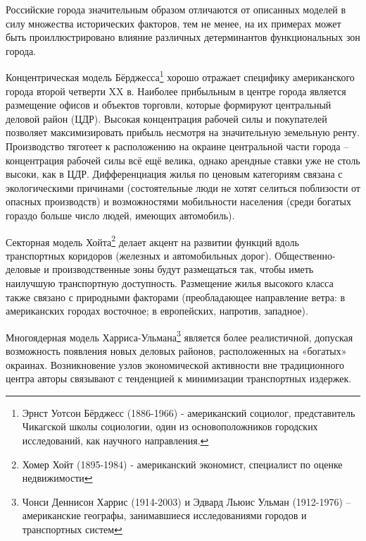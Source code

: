 \documentclass[
  11pt,
  russian,
]{book}
\begin{document}
Российские города значительным образом отличаются от описанных моделей в силу множества исторических факторов, тем не
менее, на их примерах может быть проиллюстрировано влияние различных детерминантов функциональных зон города.

Концентрическая модель Бёрджесса\footnote{Эрнст Уотсон Бёрджесс (1886-1966) - американский социолог, представитель Чикагской школы социологии, один из
  основоположников городских исследований, как научного направления.}
хорошо отражает специфику американского города второй четверти XX в. Наиболее прибыльным в центре города
является размещение офисов и объектов торговли, которые формируют центральный деловой район (ЦДР). Высокая концентрация рабочей силы и покупателей позволяет максимизировать прибыль несмотря на значительную земельную ренту. Производство
тяготеет к расположению на окраине центральной части города -- концентрация рабочей силы всё ещё велика, однако арендные ставки уже не столь высоки, как в ЦДР. Дифференциация жилья по ценовым категориям связана с экологическими причинами (состоятельные люди не хотят селиться поблизости от опасных производств) и возможностями мобильности населения (среди богатых гораздо
больше число людей, имеющих автомобиль).

Секторная модель Хойта\footnote{Хомер Хойт (1895-1984) - американский экономист, специалист по оценке недвижимости}
делает акцент на развитии функций вдоль транспортных коридоров (железных и автомобильных дорог). Общественно-деловые и производственные зоны будут размещаться так, чтобы иметь наилучшую транспортную доступность. Размещение жилья высокого класса также связано с природными факторами (преобладающее направление ветра: в американских городах восточное; в европейских, напротив,
западное).

Многоядерная модель Харриса-Ульмана\footnote{Чонси Деннисон Харрис (1914-2003) и Эдвард Льюис Ульман (1912-1976) -- американские географы, занимавшиеся
  исследованиями городов и транспортных систем} является более реалистичной, допуская возможность появления новых деловых
районов, расположенных на «богатых» окраинах. Возникновение узлов экономической активности вне традиционного центра авторы связывают с тенденцией к минимизации транспортных издержек.
\end{document}
